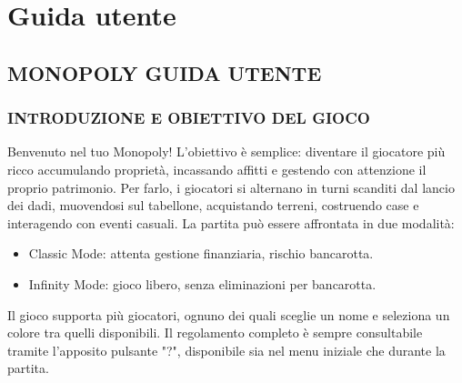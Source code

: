 \appendix
\chapter{Guida utente}
\section{MONOPOLY \- GUIDA UTENTE}
\subsection{INTRODUZIONE E OBIETTIVO DEL GIOCO}
Benvenuto nel tuo Monopoly!\newline
L’obiettivo è semplice: diventare il giocatore più ricco accumulando proprietà, incassando affitti e gestendo con attenzione il proprio patrimonio.
Per farlo, i giocatori si alternano in turni scanditi dal lancio dei dadi, muovendosi sul tabellone, acquistando terreni, costruendo case e interagendo con eventi casuali.\newline
La partita può essere affrontata in due modalità:\newline
\begin{itemize}
    \item Classic Mode: attenta gestione finanziaria, rischio bancarotta.
    \item Infinity Mode: gioco libero, senza eliminazioni per bancarotta.  
\end{itemize}
Il gioco supporta più giocatori, ognuno dei quali sceglie un nome e seleziona un colore tra quelli disponibili.
Il regolamento completo è sempre consultabile tramite l’apposito pulsante "?", disponibile sia nel menu iniziale che durante la partita.
